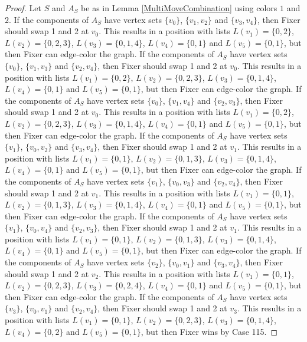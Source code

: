 \documentclass[12pt]{amsart}
\theoremstyle{plain}
\theoremstyle{definition}
\theoremstyle{remark}
\begin{document}
\begin{proof}
Let $S$ and $A_S$ be as in Lemma \ref{MultiMoveCombination} using colors $1$ and $2$. If the components of $A_S$ have vertex sets $\{v_0\}$, $\{v_1, v_2\}$ and $\{v_3, v_4\}$, then Fixer should swap 1 and 2 at $v_0$. This results in a position with lists $L(v_1) = \{0, 2\}$, $L(v_2) = \{0, 2, 3\}$, $L(v_3) = \{0, 1, 4\}$, $L(v_4) = \{0, 1\}$ and $L(v_5) = \{0, 1\}$, but then Fixer can edge-color the graph.
If the components of $A_S$ have vertex sets $\{v_0\}$, $\{v_1, v_3\}$ and $\{v_2, v_4\}$, then Fixer should swap 1 and 2 at $v_0$. This results in a position with lists $L(v_1) = \{0, 2\}$, $L(v_2) = \{0, 2, 3\}$, $L(v_3) = \{0, 1, 4\}$, $L(v_4) = \{0, 1\}$ and $L(v_5) = \{0, 1\}$, but then Fixer can edge-color the graph.
If the components of $A_S$ have vertex sets $\{v_0\}$, $\{v_1, v_4\}$ and $\{v_2, v_3\}$, then Fixer should swap 1 and 2 at $v_0$. This results in a position with lists $L(v_1) = \{0, 2\}$, $L(v_2) = \{0, 2, 3\}$, $L(v_3) = \{0, 1, 4\}$, $L(v_4) = \{0, 1\}$ and $L(v_5) = \{0, 1\}$, but then Fixer can edge-color the graph.
If the components of $A_S$ have vertex sets $\{v_1\}$, $\{v_0, v_2\}$ and $\{v_3, v_4\}$, then Fixer should swap 1 and 2 at $v_1$. This results in a position with lists $L(v_1) = \{0, 1\}$, $L(v_2) = \{0, 1, 3\}$, $L(v_3) = \{0, 1, 4\}$, $L(v_4) = \{0, 1\}$ and $L(v_5) = \{0, 1\}$, but then Fixer can edge-color the graph.
If the components of $A_S$ have vertex sets $\{v_1\}$, $\{v_0, v_3\}$ and $\{v_2, v_4\}$, then Fixer should swap 1 and 2 at $v_1$. This results in a position with lists $L(v_1) = \{0, 1\}$, $L(v_2) = \{0, 1, 3\}$, $L(v_3) = \{0, 1, 4\}$, $L(v_4) = \{0, 1\}$ and $L(v_5) = \{0, 1\}$, but then Fixer can edge-color the graph.
If the components of $A_S$ have vertex sets $\{v_1\}$, $\{v_0, v_4\}$ and $\{v_2, v_3\}$, then Fixer should swap 1 and 2 at $v_1$. This results in a position with lists $L(v_1) = \{0, 1\}$, $L(v_2) = \{0, 1, 3\}$, $L(v_3) = \{0, 1, 4\}$, $L(v_4) = \{0, 1\}$ and $L(v_5) = \{0, 1\}$, but then Fixer can edge-color the graph.
If the components of $A_S$ have vertex sets $\{v_2\}$, $\{v_0, v_1\}$ and $\{v_3, v_4\}$, then Fixer should swap 1 and 2 at $v_2$. This results in a position with lists $L(v_1) = \{0, 1\}$, $L(v_2) = \{0, 2, 3\}$, $L(v_3) = \{0, 2, 4\}$, $L(v_4) = \{0, 1\}$ and $L(v_5) = \{0, 1\}$, but then Fixer can edge-color the graph.
If the components of $A_S$ have vertex sets $\{v_3\}$, $\{v_0, v_1\}$ and $\{v_2, v_4\}$, then Fixer should swap 1 and 2 at $v_3$. This results in a position with lists $L(v_1) = \{0, 1\}$, $L(v_2) = \{0, 2, 3\}$, $L(v_3) = \{0, 1, 4\}$, $L(v_4) = \{0, 2\}$ and $L(v_5) = \{0, 1\}$, but then Fixer wins by Case 115.

\end{proof}
\end{document}
